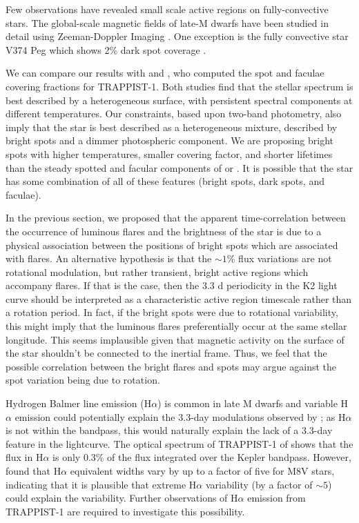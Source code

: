 Few observations have revealed small scale active regions on fully-convective stars. The global-scale magnetic fields of late-M dwarfs have been studied in detail using Zeeman-Doppler Imaging \citep{Donati2003, Morin2010, Morin2011, Morin2013}. One exception is the fully convective star V374 Peg which shows 2\% dark spot coverage \citep{Morin2008}. 

We can compare our results with \citet{Rackham2017b} and \citet{Zhang2018}, who computed the spot and faculae covering fractions for TRAPPIST-1. Both studies find that the stellar spectrum is best described by a heterogeneous surface, with persistent spectral components at different temperatures. Our constraints, based upon two-band photometry, also imply that the star is best described as a heterogeneous mixture, described by bright spots and a dimmer photospheric component. We are proposing bright spots with higher temperatures, smaller covering factor, and shorter lifetimes than the steady spotted and facular components of \citet{Rackham2017b} or \citet{Zhang2018}.  It is possible that the star has some combination of all of these features (bright spots, dark spots, and faculae).

In the previous section, we proposed that the apparent time-correlation between the occurrence of luminous flares and the brightness of the star is due to a physical association between the positions of bright spots which are associated with flares. An alternative hypothesis is that the $\sim 1$\% flux variations are not rotational modulation, but rather transient, bright active regions which accompany flares. If that is the case, then the 3.3 d periodicity in the K2 light curve should be interpreted as a characteristic active region timescale rather than a rotation period.  In fact, if the bright spots were due to rotational variability, this might imply that the luminous flares preferentially occur at the same stellar longitude.  This seems implausible given that magnetic activity on the surface of the star shouldn't be connected to the inertial frame.  Thus, we feel that the possible correlation between the bright flares and spots may argue against the spot variation being due to rotation.

Hydrogen Balmer line emission (H$\alpha$) is common in late M dwarfs and variable H$\alpha$ emission could potentially explain the 3.3-day modulations observed by \kepler; as H$\alpha$ is not within the \spitzer bandpass, this would naturally explain the lack of a 3.3-day feature in the \spitzer lightcurve.  The optical spectrum of TRAPPIST-1 of \citet{Burgasser2015} shows that the flux in H$\alpha$ is only 0.3\% of the flux integrated over the Kepler bandpass. However, \citet{Kruse2010} found that H$\alpha$ equivalent widths vary by up to a factor of five for M8V stars, indicating that it is plausible that extreme H$\alpha$ variability (by a factor of $\sim 5$) could explain the \kepler variability. Further observations of H$\alpha$ emission from TRAPPIST-1 are required to investigate this possibility.

